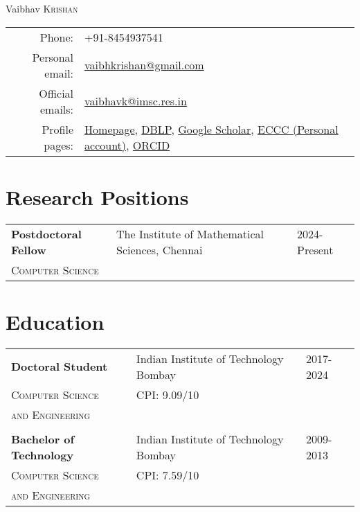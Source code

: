 \documentclass[a4paper,10pt]{article}
\begin{document}
\par{\centering
{\Huge Vaibhav \textsc{Krishan}
}\bigskip\par}

\begin{tabular}{rl}
  Phone: & +91-8454937541 \\
  Personal email: & \href{mailto:vaibhkrishan@gmail.com}{vaibhkrishan@gmail.com} \\ 
  Official emails: & \href{mailto:vaibhavk@imsc.res.in}{vaibhavk@imsc.res.in}\\
  Profile pages: & \href{https://vaibhkrishan.github.io}{Homepage}, 
  \href{https://dblp.org/pid/187/8296.html}{DBLP},
  \href{https://scholar.google.com/citations?user=dVMC44EAAAAJ&hl=en}{Google Scholar},
  \href{https://eccc.weizmann.ac.il/author/1412/">ECCC (IIT Bombay account)</a>, <a href="https://eccc.weizmann.ac.il/author/985/}{ECCC (Personal account)},
  \href{https://orcid.org/0009-0000-0335-1963}{ORCID}
\end{tabular}

\section{Research Positions}

\begin{tabular}{lll}
  {\bf Postdoctoral Fellow} & The Institute of Mathematical Sciences, Chennai & 2024-Present \\
  \textsc{Computer Science} &  & 
\end{tabular}

\section{Education}

\begin{tabular}{lll}
  {\bf Doctoral Student} & Indian Institute of Technology Bombay & 2017-2024 \\
  \textsc{Computer Science} & CPI: 9.09/10 & \\
  \textsc{and Engineering} \\
  \\
  {\bf Bachelor of Technology} & Indian Institute of Technology Bombay & 2009-2013 \\
  \textsc{Computer Science} & CPI: 7.59/10 & \\
  \textsc{and Engineering} & & \\
\end{tabular}
\end{document}
